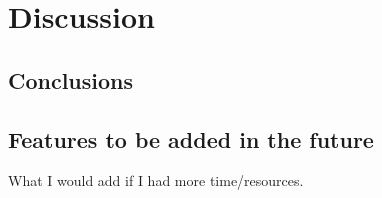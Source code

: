 \chapter{Discussion}
\label{chapter4}

\section{Conclusions}

\section{Features to be added in the future}
What I would add if I had more time/resources.

